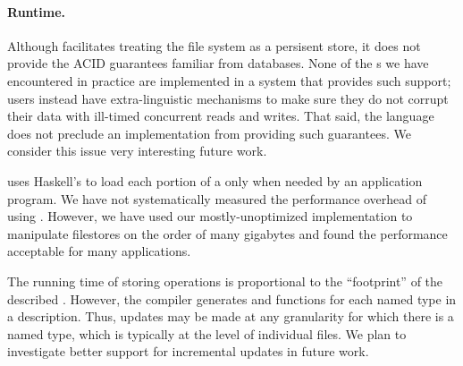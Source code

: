 \paragraph{Runtime.}
Although \forest{} facilitates treating the file system as a
persisent store, it does not provide the ACID guarantees familiar from
databases.  None of the \filestore{}s we
have encountered in practice are implemented in a system that provides
such support; users instead have extra-linguistic mechanisms to make
sure they do not corrupt their data with ill-timed concurrent reads
and writes. That said, the \forest{} language does not preclude an
implementation from providing such guarantees. We consider this issue
very interesting future work. 

\forest{} uses Haskell's  to load each portion
of a \filestore{} only when needed by an application program.
We have not systematically measured the performance overhead of using
\forest{}.  However, we have used our
mostly-unoptimized implementation to manipulate filestores on the
order of many gigabytes and found the performance acceptable
for many applications.  

The running time of storing operations is proportional to the
``footprint'' of the described \filestore{}. However, the \forest{}
compiler generates  and  functions for each
named type in a description. Thus, updates may be made at any
granularity for which there is a named type, which is typically at the
level of individual files. We plan to investigate better support for
incremental updates in future work.



